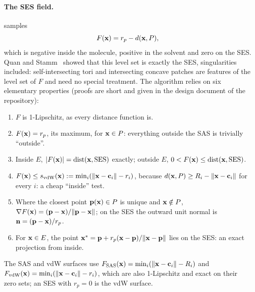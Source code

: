 \paragraph{The SES field.}
\sesmesh{} samples
\begin{equation}
  F(\mathbf{x}) = r_p - d(\mathbf{x}, P),
  \label{eq:field}
\end{equation}
which is negative inside the molecule, positive in the solvent and zero on
the SES. Quan and Stamm~\cite{quan2016} showed that this level set is
exactly the SES, singularities included: self-intersecting tori and
intersecting concave patches are features of the level set of $F$ and need
no special treatment. The algorithm relies on six elementary properties
(proofs are short and given in the design document of the
repository):
\begin{enumerate}[label=(P\arabic*)]
  \item $F$ is 1-Lipschitz, as every distance function is.
    \label{p:lipschitz}
  \item $F(\mathbf{x}) = r_p$, its maximum, for $\mathbf{x} \in P$: everything
    outside the SAS is trivially ``outside''.
  \item Inside $E$, $|F(\mathbf{x})| = \operatorname{dist}(\mathbf{x}, \mathrm{SES})$
    exactly; outside $E$, $0 < F(\mathbf{x}) \le \operatorname{dist}(\mathbf{x},
    \mathrm{SES})$. \label{p:dist}
  \item $F(\mathbf{x}) \le s_{\mathrm{vdW}}(\mathbf{x}) :=
    \min_i(\lVert\mathbf{x} - \mathbf{c}_i\rVert - r_i)$, because
    $d(\mathbf{x}, P) \ge R_i - \lVert\mathbf{x} - \mathbf{c}_i\rVert$ for every $i$: a
    cheap ``inside'' test. \label{p:vdw}
  \item Where the closest point $\mathbf{p}(\mathbf{x}) \in P$ is unique and
    $\mathbf{x} \notin P$, $\nabla F(\mathbf{x}) = (\mathbf{p} - \mathbf{x}) /
    \lVert\mathbf{p} - \mathbf{x}\rVert$; on the SES the outward unit normal is
    $\mathbf{n} = (\mathbf{p} - \mathbf{x})/r_p$. \label{p:normal}
  \item For $\mathbf{x} \in E$, the point $\mathbf{x}^* = \mathbf{p} + r_p(\mathbf{x} -
    \mathbf{p})/\lVert\mathbf{x} - \mathbf{p}\rVert$ lies on the SES: an exact projection
    from inside. \label{p:project}
\end{enumerate}
The SAS and vdW surfaces use $F_{\mathrm{SAS}}(\mathbf{x}) =
\min_i(\lVert\mathbf{x} - \mathbf{c}_i\rVert - R_i)$ and $F_{\mathrm{vdW}}(\mathbf{x}) =
\min_i(\lVert\mathbf{x} - \mathbf{c}_i\rVert - r_i)$, which are also 1-Lipschitz and
exact on their zero sets; an SES with $r_p = 0$ is the vdW surface.

